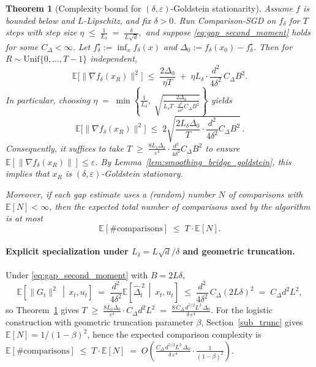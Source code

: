 \documentclass[11pt]{article}
\theoremstyle{plain}
\newtheorem{theorem}{Theorem}[section]
\theoremstyle{remark}
\newcommand{\E}{\mathbb{E}}
\newcommand{\1}{\mathbf{1}}
\begin{document}
\leavevmode\par\smallskip
\begin{propbox}
\begin{theorem}[Complexity bound for $(\delta,\varepsilon)$-Goldstein stationarity]
\label{thm:comparison_complexity}
Assume $f$ is bounded below and $L$-Lipschitz, and fix $\delta>0$.
Run Comparison-SGD on $f_\delta$ for $T$ steps with step size
$
\eta \;\le\; \frac{1}{L_\delta}\;=\;\frac{\delta}{L\sqrt d},
$
and suppose \eqref{eq:gap_second_moment} holds for some $C_\Delta<\infty$.
Let $f_\delta^\star:=\inf_x f_\delta(x)$ and $\Delta_0 := f_\delta(x_0)-f_\delta^\star$.
Then for $R\sim\mathrm{Unif}\{0,\dots,T-1\}$ independent,
\[
\E\big[\|\nabla f_\delta(x_R)\|^2\big]
\;\le\;
\frac{2\Delta_0}{\eta T} \;+\; \eta L_\delta \cdot
\frac{d^2}{4\delta^2}\,C_\Delta B^2.
\]
In particular, choosing
$
\eta \;=\; \min\!\left\{\frac{1}{L_\delta},\;
\sqrt{\frac{2\Delta_0}{L_\delta T \cdot \frac{d^2}{4\delta^2}C_\Delta B^2}}\right\}
$
yields
\[
\E\big[\|\nabla f_\delta(x_R)\|^2\big]
\;\le\;
2\sqrt{\frac{2L_\delta \Delta_0}{T}\cdot
\frac{d^2}{4\delta^2}C_\Delta B^2}\,.
\]
Consequently, it suffices to take
$
T \;\ge\;
\frac{8L_\delta \Delta_0}{\varepsilon^4}\cdot
\frac{d^2}{4\delta^2}C_\Delta B^2$
to ensure 
$\E[\|\nabla f_\delta(x_R)\|]\le \varepsilon$.
By Lemma~\ref{lem:smoothing_bridge_goldstein}, this implies that $x_R$ is $(\delta,\varepsilon)$-Goldstein stationary.

Moreover, if each gap estimate uses a (random) number $N$ of comparisons with $\E[N]<\infty$,
then the expected total number of comparisons used by the algorithm is at most
\[
\E[\#\text{comparisons}] \;\le\; T\cdot \E[N].
\]
\end{theorem}
\end{propbox}
\par\smallskip

\paragraph{Explicit specialization under $L_\delta=L\sqrt d/\delta$ and geometric truncation.}
Under \eqref{eq:gap_second_moment} with $B=2L\delta$,
\[
\E\!\left[\|G_t\|^2 \,\middle|\, x_t,u_t\right]
\;=\;
\frac{d^2}{4\delta^2}\E\!\left[\widehat{\Delta}_t^{\,2}\,\middle|\,x_t,u_t\right]
\;\le\;
\frac{d^2}{4\delta^2}\,C_\Delta(2L\delta)^2
\;=\;
C_\Delta d^2 L^2,
\]
so Theorem~\ref{thm:comparison_complexity} gives
$
T \;\ge\; \frac{8L_\delta \Delta_0}{\varepsilon^4}\cdot C_\Delta d^2L^2
\;=\;
\frac{8\,C_\Delta\, d^{5/2} L^3\,\Delta_0}{\delta\,\varepsilon^4}.
$
For the logistic construction with geometric truncation parameter $\beta$,
Section~\ref{sub_trunc} gives $\E[N]=1/(1-\beta)^2$, hence the expected comparison complexity is
$
\E[\#\text{comparisons}]
\;\le\;
T\cdot\E[N]
\;=\;
O\!\left(
\frac{C_\Delta\, d^{5/2} L^3\,\Delta_0}{\delta\,\varepsilon^4}\cdot
\frac{1}{(1-\beta)^2}
\right).$
\end{document}
